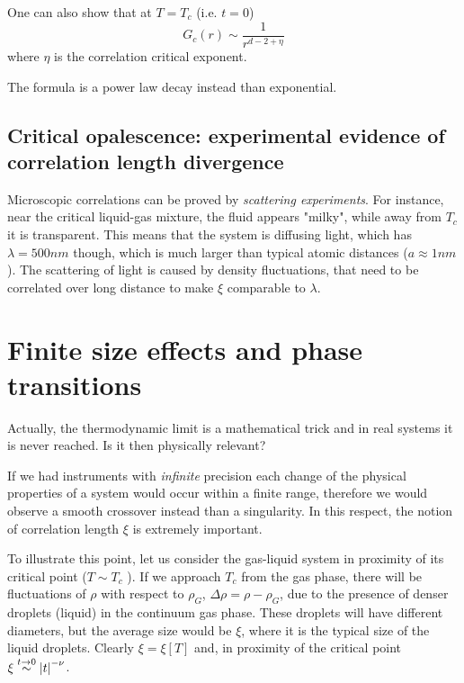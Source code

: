 \documentclass[../main/main.tex]{subfiles}
\begin{document}
One can also show that at \( T=T_c \) (i.e. \( t=0 \))
\begin{equation}
  G_c (r) \sim \frac{1}{r^{d-2+\eta }}
\end{equation}
where \( \eta  \) is the correlation critical exponent.
\begin{remark}
The formula is a power law decay instead than exponential.
\end{remark}

\subsection{Critical opalescence: experimental evidence of correlation length divergence}
Microscopic correlations can be proved by \textit{scattering experiments}. For instance, near the critical liquid-gas mixture, the fluid appears "milky", while away from $T_c$ it is transparent. This means that the system is diffusing light, which has $\lambda=500nm$ though, which is much larger than typical atomic distances ($a \approx 1nm$). The scattering of light is caused by density fluctuations, that need to be correlated over long distance to make $\xi$ comparable to $\lambda$.

\section{Finite size effects and phase transitions}
Actually, the thermodynamic limit is a mathematical trick and in real systems it is never reached. Is it then physically relevant?

If we had instruments with \emph{infinite} precision each change of the physical properties of a system would occur within a finite range, therefore we would observe a smooth crossover instead than a singularity. In this respect, the notion of correlation length \( \xi  \) is extremely important.

To illustrate this point, let us consider the gas-liquid system in proximity of its critical point (\( T \sim T_c \) ). If we approach \( T_c \) from the gas phase, there will be fluctuations of \( \rho  \) with respect to \( \rho _G \), \( \Delta \rho = \rho - \rho _G \), due to the presence of denser droplets (liquid) in the continuum gas phase.
These droplets will have different diameters, but the average size would be \( \xi  \), where it is the typical size of the liquid droplets.
Clearly \( \xi = \xi [T] \) and, in proximity of the critical point \( \xi  \overset{t \rightarrow 0}{\sim } \abs{t}^{-\nu }   \).
\end{document}
